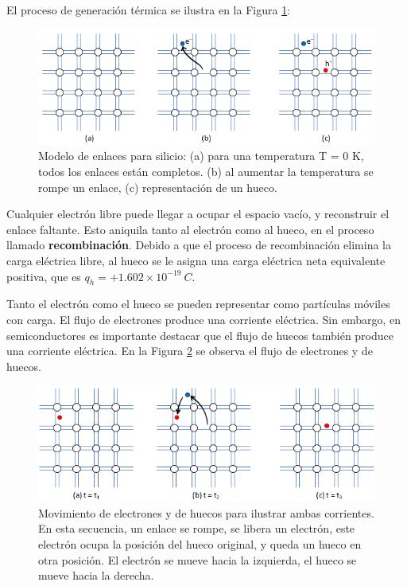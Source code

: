 El proceso de generación térmica se ilustra en la Figura \ref{generacion_recombinacion_1}:

\begin{figure}[H]
    \centering
    \includegraphics{figuras/generacion_y_recombinacion_1.png}
    \caption{Modelo de enlaces para silicio: (a) para una temperatura T = 0 K, todos los enlaces están completos. (b) al aumentar la temperatura se rompe un enlace, (c) representación de un hueco.}
    \label{generacion_recombinacion_1}
\end{figure}

Cualquier electrón libre puede llegar a ocupar el espacio vacío, y reconstruir el enlace faltante. Esto aniquila tanto al electrón como al hueco, en el proceso llamado \textbf{recombinación}. Debido a que el proceso de recombinación elimina la carga eléctrica libre, al hueco se le asigna una carga eléctrica neta equivalente positiva, que es $q_h=+1.602\times{}10^{-19}\ C$.

Tanto el electrón como el hueco se pueden representar como partículas móviles con carga. El flujo de electrones produce una corriente eléctrica. Sin embargo, en semiconductores es importante destacar que el flujo de huecos también produce una corriente eléctrica. En la Figura \ref{generacion_recombinacion_2} se observa el flujo de electrones y de huecos.

\begin{figure}[H]
    \centering
    \includegraphics{figuras/generacion_y_recombinacion_2.png}
    \caption{Movimiento de electrones y de huecos para ilustrar ambas corrientes. En esta secuencia, un enlace se rompe, se libera un electrón, este electrón ocupa la posición del hueco original, y queda un hueco en otra posición. El electrón se mueve hacia la izquierda, el hueco se mueve hacia la derecha.}
    \label{generacion_recombinacion_2}
\end{figure}

